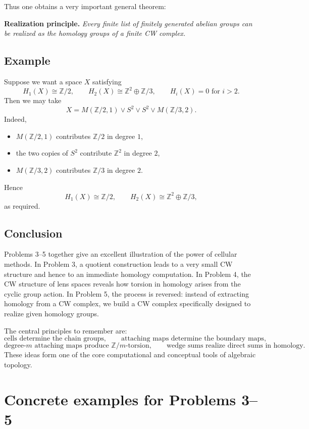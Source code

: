 \documentclass[12pt,a4paper]{article}
\theoremstyle{notespace}
\begin{document}
Thus one obtains a very important general theorem:

\medskip
\noindent
\textbf{Realization principle.}
\emph{Every finite list of finitely generated abelian groups can be realized as the homology groups of a finite CW complex.}

\subsection{Example}

Suppose we want a space \(X\) satisfying
\[
H_1(X)\cong \mathbb Z/2,
\qquad
H_2(X)\cong \mathbb Z^2\oplus \mathbb Z/3,
\qquad
H_i(X)=0 \text{ for } i>2.
\]
Then we may take
\[
X
=
M(\mathbb Z/2,1)\vee S^2\vee S^2\vee M(\mathbb Z/3,2).
\]
Indeed,
\begin{itemize}
	\item \(M(\mathbb Z/2,1)\) contributes \(\mathbb Z/2\) in degree \(1\),
	\item the two copies of \(S^2\) contribute \(\mathbb Z^2\) in degree \(2\),
	\item \(M(\mathbb Z/3,2)\) contributes \(\mathbb Z/3\) in degree \(2\).
\end{itemize}
Hence
\[
H_1(X)\cong \mathbb Z/2,
\qquad
H_2(X)\cong \mathbb Z^2\oplus \mathbb Z/3,
\]
as required.

\subsection*{Conclusion}
Problems 3--5 together give an excellent illustration of the power of cellular methods. In Problem 3, a quotient construction leads to a very small CW structure and hence to an immediate homology computation. In Problem 4, the CW structure of lens spaces reveals how torsion in homology arises from the cyclic group action. In Problem 5, the process is reversed: instead of extracting homology from a CW complex, we build a CW complex specifically designed to realize given homology groups.

The central principles to remember are:
\[
\boxed{\text{cells determine the chain groups}},
\qquad
\boxed{\text{attaching maps determine the boundary maps}},
\]
\[
\boxed{\text{degree-\(m\) attaching maps produce \(\mathbb Z/m\)-torsion}},
\qquad
\boxed{\text{wedge sums realize direct sums in homology}}.
\]
These ideas form one of the core computational and conceptual tools of algebraic topology.

\section{Concrete examples for Problems 3--5}
\end{document}
